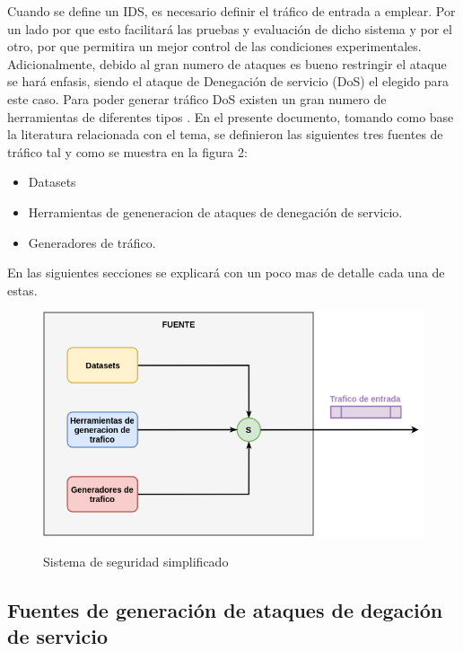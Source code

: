 \documentclass[12pt]{article}
\begin{document}
Cuando se define un IDS, es necesario definir el tráfico de entrada a emplear. Por un lado por que esto facilitará las pruebas y evaluación de dicho sistema y por el otro, por que permitira un mejor control de las condiciones experimentales. Adicionalmente, debido al gran numero de ataques es bueno restringir el ataque se hará enfasis, siendo el ataque de Denegación de servicio (DoS) el elegido para este caso. Para poder generar tráfico DoS existen un gran numero de herramientas de diferentes tipos \citep{dos_tools,net_attacks_taxonomy}. En el presente documento, tomando como base la literatura relacionada con el tema, se definieron las siguientes tres fuentes de tráfico tal y como se muestra en la figura 2:
\begin{itemize}
\item Datasets
\item Herramientas de geneneracion de ataques de denegación de servicio.
\item Generadores de tráfico.
\end{itemize}

En las siguientes secciones se explicará con un poco mas de detalle cada una de estas.

\begin{figure}[htbp]
\begin{center}
\includegraphics[scale=0.5]{sources.png}\\[1cm] %
\caption{Sistema de seguridad simplificado}
\end{center}
\end{figure}


\subsection{Fuentes de generación de ataques de degación de servicio}
\end{document}
